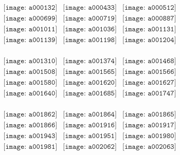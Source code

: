 \documentclass{article}
\begin{document}
\begin{figure}[H]
 \begin{center}$
 \begin{array}{cccc}
\texttt{[image: a000132]}&\texttt{[image: a000433]}&\texttt{[image: a000512]}\\\texttt{[image: a000699]}&\texttt{[image: a000719]}&\texttt{[image: a000887]}\\\texttt{[image: a001011]}&\texttt{[image: a001036]}&\texttt{[image: a001131]}\\\texttt{[image: a001139]}&\texttt{[image: a001198]}&\texttt{[image: a001204]}\\
\end{array}$
\end{center}
\end{figure}

\begin{figure}[H]
 \begin{center}$
 \begin{array}{cccc}
\texttt{[image: a001310]}&\texttt{[image: a001374]}&\texttt{[image: a001468]}\\\texttt{[image: a001508]}&\texttt{[image: a001565]}&\texttt{[image: a001566]}\\\texttt{[image: a001580]}&\texttt{[image: a001620]}&\texttt{[image: a001627]}\\\texttt{[image: a001640]}&\texttt{[image: a001685]}&\texttt{[image: a001747]}\\
\end{array}$
\end{center}
\end{figure}

\begin{figure}[H]
 \begin{center}$
 \begin{array}{cccc}
\texttt{[image: a001862]}&\texttt{[image: a001864]}&\texttt{[image: a001865]}\\\texttt{[image: a001866]}&\texttt{[image: a001916]}&\texttt{[image: a001917]}\\\texttt{[image: a001943]}&\texttt{[image: a001951]}&\texttt{[image: a001980]}\\\texttt{[image: a001981]}&\texttt{[image: a002062]}&\texttt{[image: a002063]}\\
\end{array}$
\end{center}
\end{figure}
\end{document}
